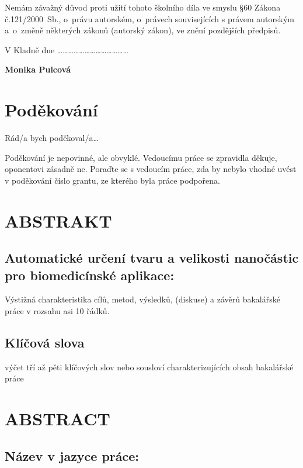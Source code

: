 \documentclass[a4paper,12pt]{article}   %
\numberwithin{equation}{section}        %
\newcommand{\autor}{Monika Pulcová}
\newcommand{\nazevENG}{Název v jazyce práce}
\newcommand{\nazev}{Automatické určení tvaru a velikosti nanočástic pro biomedicínské aplikace}
\begin{document}
    \hspace{-0.75cm}Nemám závažný důvod proti užití tohoto školního díla ve smyslu \S 60 Zákona č.121/2000~Sb., o~právu autorském, o~právech souvisejících s právem autorským a~o~změně některých zákonů (autorský zákon), ve znění pozdějších předpisů. 
    
    \vspace{1em}
    
    \hspace{-0.75cm}V Kladně dne \ldots \ldots \ldots \hfill \ldots \ldots \ldots \ldots \ldots \ldots \ldots \ldots \ldots \ldots

    \hspace{10cm} \textbf{\autor}

	\clearpage
	
	\null\vfill
	\section*{Poděkování}
	Rád/a bych poděkoval/a… 
	    
    Poděkování je nepovinné, ale obvyklé. 
    Vedoucímu práce se zpravidla děkuje, oponentovi zásadně ne. 
    Poraďte se s vedoucím práce, zda by nebylo vhodné uvést v poděkování číslo grantu, ze kterého byla práce podpořena.  

    \clearpage	

	
	\null\vfill	
	\section*{ABSTRAKT}
        \subsection*{\nazev:}
	    Výstižná charakteristika cílů, metod, výsledků, (diskuse) a závěrů bakalářské práce v rozsahu asi 10 řádků. 
	\subsection*{Klíčová slova}
		výčet tří až pěti klíčových slov nebo sousloví charakterizujících obsah bakalářské práce
	\clearpage
		
		
	\null\vfill	
	\section*{ABSTRACT}
        \subsection*{\nazevENG:}
		 
\end{document}
